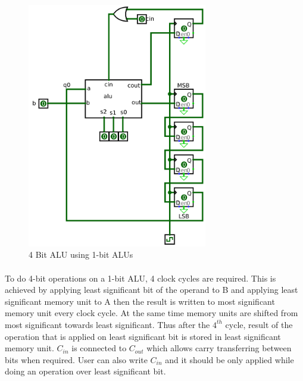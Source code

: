 \documentclass[pdftex,12pt,a4paper]{article}
\begin{document}
\begin{flushleft}
\begin{figure}[h]
	\centering
	\includegraphics[width=0.7\textwidth]{4b.png}	
	\caption{4 Bit ALU using 1-bit ALUs}
	\label{circ:part2}
\end{figure}

\paragraph{}
 To do 4-bit operations on a 1-bit ALU, 4 clock cycles are required. This is achieved by applying least significant bit of the operand to B and applying least significant memory unit to A then the result is written to most significant memory unit every clock cycle. At the same time memory units are shifted from most significant towards least significant. Thus after the $4^{th}$ cycle, result of the operation that is applied on least significant bit is stored in least significant memory unit. $C_{in}$ is connected to $C_{out}$ which allows carry transferring between bits when required. User can also write $C_{in}$ and it should be only applied while doing an operation over least significant bit.


\end{flushleft}
\end{document}
